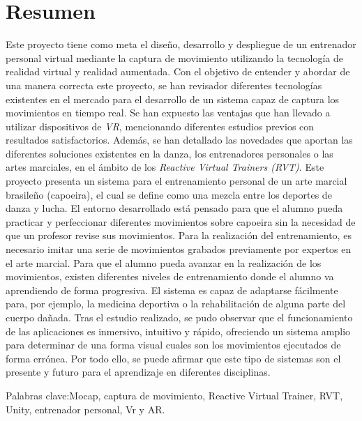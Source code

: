 %
%


\chapter*{Resumen}

Este proyecto tiene como meta el diseño, desarrollo y despliegue de un entrenador personal virtual mediante la captura de movimiento utilizando la tecnología de realidad virtual y realidad aumentada.
Con el objetivo de entender y abordar de una manera correcta este proyecto, se han revisador diferentes tecnologías existentes en el mercado para el desarrollo de un sistema capaz de captura los movimientos en tiempo real. Se han expuesto las ventajas que han llevado a utilizar dispositivos de \textit{VR}, mencionando diferentes estudios previos con resultados satisfactorios. Además, se han detallado las novedades que aportan las diferentes soluciones existentes en la danza, los entrenadores personales o las artes marciales, en el ámbito de los \textit{Reactive Virtual Trainers (RVT)}.
Este proyecto presenta un sistema para el entrenamiento personal de un arte marcial brasileño (capoeira), el cual se define como una mezcla entre los deportes de danza y lucha. El entorno desarrollado está pensado para que el alumno pueda practicar y perfeccionar diferentes movimientos sobre capoeira sin la necesidad de que un profesor revise sus movimientos.
Para la realización del entrenamiento, es necesario imitar una serie de movimientos grabados previamente por expertos en el arte marcial. Para que el alumno pueda avanzar en la realización de los movimientos, existen diferentes niveles de entrenamiento donde el alumno va aprendiendo de forma progresiva.
El sistema es capaz de adaptarse fácilmente para, por ejemplo, la medicina deportiva o la rehabilitación de alguna parte del cuerpo dañada.
Tras el estudio realizado, se pudo observar que el funcionamiento de las aplicaciones es inmersivo, intuitivo y rápido, ofreciendo un sistema amplio para 
determinar de una forma visual cuales son los movimientos ejecutados de forma errónea. Por todo ello, se puede afirmar que este tipo de sistemas son el presente y futuro para el aprendizaje en diferentes disciplinas.




Palabras clave:Mocap, captura de movimiento, Reactive Virtual Trainer, RVT, Unity, entrenador personal, Vr y AR.
